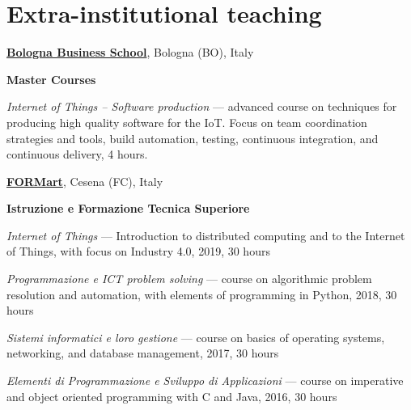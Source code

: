 \section{Extra-institutional teaching}
\href{https://www.bbs.unibo.eu/hp/}{\textbf{Bologna Business School}}, Bologna (BO), Italy
\begin{outerlist}
\item[] \textbf{Master Courses} %
    \begin{innerlist}
        \item \textit{Internet of Things -- Software production} --- advanced course on techniques for producing high quality software for the IoT. Focus on team coordination strategies and tools, build automation, testing, continuous integration, and continuous delivery, 4 hours.
\end{innerlist}
\halfblankline
\end{outerlist}

\href{http://www.formart.it/}{\textbf{FORMart}}, Cesena (FC), Italy
\begin{outerlist}
\item[] \textbf{Istruzione e Formazione Tecnica Superiore}
    \begin{innerlist}
        \item \textit{Internet of Things} --- Introduction to distributed computing and to the Internet of Things, with focus on Industry 4.0, 2019, 30 hours
        \item \textit{Programmazione e ICT problem solving} --- course on algorithmic problem resolution and automation, with elements of programming in Python, 2018, 30 hours
        \item \textit{Sistemi informatici e loro gestione} --- course on basics of operating systems, networking, and database management, 2017, 30 hours
        \item \textit{Elementi di Programmazione e Sviluppo di Applicazioni} --- course on imperative and object oriented programming with C and Java, 2016, 30 hours
    \end{innerlist}
\halfblankline
\end{outerlist}
